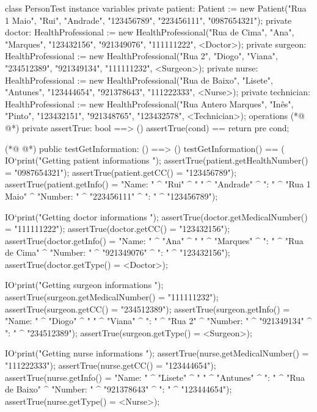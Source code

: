 \begin{vdmpp}[breaklines=true]
class PersonTest
instance variables
 private patient: Patient := new Patient("Rua 1 Maio", "Rui", "Andrade", "123456789", "223456111", "0987654321");
 private doctor: HealthProfessional := new HealthProfessional("Rua de Cima", "Ana", "Marques", "123432156", "921349076", "111111222", <Doctor>);
 private surgeon: HealthProfessional := new HealthProfessional("Rua 2", "Diogo", "Viana", "234512389", "921349134", "111111232", <Surgeon>);
 private nurse: HealthProfessional := new HealthProfessional("Rua de Baixo", "Lisete", "Antunes", "123444654", "921378643", "111222333", <Nurse>);
 private technician: HealthProfessional := new HealthProfessional("Rua Antero Marques", "Inês", "Pinto", "123432151", "921348765", "123432578", <Technician>);
operations
(*@
\label{assertTrue:9}
@*)
 private assertTrue: bool ==> ()
  assertTrue(cond) == return
 pre cond;
 
(*@
\label{testGetInformation:13}
@*)
 public testGetInformation: () ==> ()
  testGetInformation() == (
   IO`print("\n Getting patient informations \n");
   assertTrue(patient.getHealthNumber() = "0987654321");
   assertTrue(patient.getCC() = "123456789");
   assertTrue(patient.getInfo() = "Name: " ^ "Rui" ^ " " ^ "Andrade" ^ "\nAddress: " ^ "Rua 1 Maio" ^ "\nPhone Number: " ^ "223456111" ^ "\nCC: " ^ "123456789");
   
   IO`print("\n Getting doctor informations \n");
   assertTrue(doctor.getMedicalNumber() = "111111222");
   assertTrue(doctor.getCC() = "123432156");
   assertTrue(doctor.getInfo() = "Name: " ^ "Ana" ^ " " ^ "Marques" ^ "\nAddress: " ^ "Rua de Cima" ^ "\nPhone Number: " ^ "921349076" ^ "\nCC: " ^ "123432156");
   assertTrue(doctor.getType() = <Doctor>);
   
   IO`print("\n Getting surgeon informations \n");
   assertTrue(surgeon.getMedicalNumber() = "111111232");
   assertTrue(surgeon.getCC() = "234512389");
   assertTrue(surgeon.getInfo() = "Name: " ^ "Diogo" ^ " " ^ "Viana" ^ "\nAddress: " ^ "Rua 2" ^ "\nPhone Number: " ^ "921349134" ^ "\nCC: " ^ "234512389");
   assertTrue(surgeon.getType() = <Surgeon>);
   
   IO`print("\n Getting nurse informations \n");
   assertTrue(nurse.getMedicalNumber() = "111222333");
   assertTrue(nurse.getCC() = "123444654");
   assertTrue(nurse.getInfo() = "Name: " ^ "Lisete" ^ " " ^ "Antunes" ^ "\nAddress: " ^ "Rua de Baixo" ^ "\nPhone Number: " ^ "921378643" ^ "\nCC: " ^ "123444654");
   assertTrue(nurse.getType() = <Nurse>);
   

\end{vdmpp}
